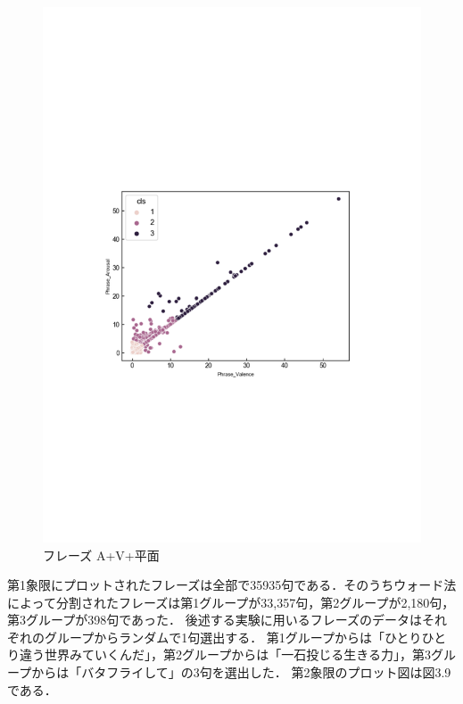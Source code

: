 \begin{figure}[H]
    \centering
    \includegraphics[width=14cm]{phrase_A+V+.pdf}
    \vspace{-1mm}
    \caption{フレーズ A+V+平面}
    \label{fig:mms}
    \vspace{5mm}
\end{figure}
第1象限にプロットされたフレーズは全部で35935句である．そのうちウォード法によって分割されたフレーズは第1グループが33,357句，第2グループが2,180句，第3グループが398句であった．
後述する実験に用いるフレーズのデータはそれぞれのグループからランダムで1句選出する．
第1グループからは「ひとりひとり違う世界みていくんだ」，第2グループからは「一石投じる生きる力」，第3グループからは「バタフライして」の3句を選出した．
\newpage
第2象限のプロット図は図3.9である．

